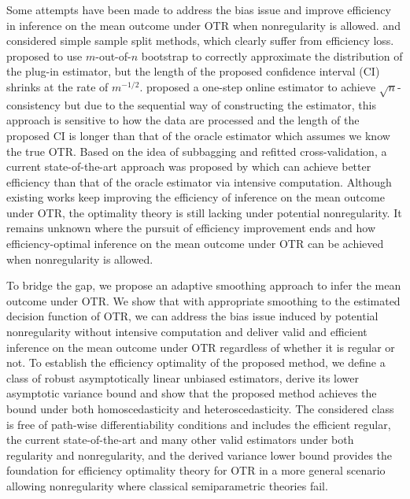 \documentclass[11pt]{article}
\theoremstyle{referenceplain}
\theoremstyle{referencedefinition}
\theoremstyle{referenceremark}
\begin{document}
Some attempts have been made to address the bias issue and improve efficiency in inference on the mean outcome under OTR when nonregularity is allowed.  \citet{wager2018estimation} and \citet{wang2018learning} considered simple sample split methods, which clearly suffer from efficiency loss. \citet{chakraborty2010inference,chakraborty2014inference} proposed to use $m$-out-of-$n$ bootstrap to correctly approximate the distribution of the plug-in estimator, but the length of the proposed confidence interval (CI) shrinks at the rate of $m^{-1/2}$. \citet{luedtke2016statistical} proposed a one-step online estimator to achieve $\sqrt{n}$-consistency but due to the sequential way of constructing the estimator, this approach is sensitive to how the data are processed and the length of the proposed CI is longer than that of the oracle estimator which assumes we know the true OTR. Based on  the idea of subbagging and refitted cross-validation, a current state-of-the-art approach was proposed by \citet{shi2020breaking} which can achieve better efficiency than that of the oracle estimator via intensive computation. Although existing works keep improving the efficiency of inference on the mean outcome under OTR, the optimality theory is still lacking under potential nonregularity. It remains unknown where the pursuit of efficiency improvement ends and how efficiency-optimal inference on the mean outcome under OTR can be achieved when nonregularity is allowed.

To bridge the gap, we propose an adaptive smoothing approach to infer the mean outcome under OTR. We show that with appropriate smoothing to the estimated decision function of OTR, we can address the bias issue induced by potential nonregularity without intensive computation and deliver valid and efficient inference on the mean outcome under OTR regardless of whether it is regular or not. To establish the efficiency optimality of the proposed method, we define a class of robust asymptotically linear unbiased estimators, derive its lower asymptotic variance bound and show that the proposed method achieves the bound under both homoscedasticity and heteroscedasticity. The considered class is free of path-wise differentiability conditions and includes the efficient regular, the current state-of-the-art and many other valid estimators under both regularity and nonregularity, and the derived variance lower bound provides the foundation for efficiency optimality theory for OTR in a more general scenario allowing nonregularity where classical semiparametric theories fail. 
\end{document}
